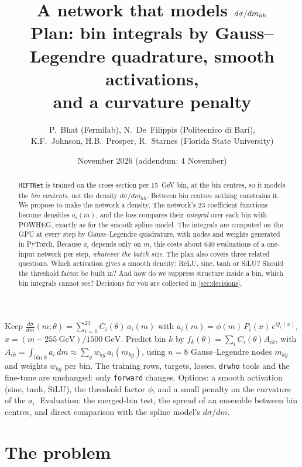 \documentclass[11pt]{article}
\title{\textbf{A network that models $d\sigma/d\mhh$}\\[4pt]
\large Plan: bin integrals by Gauss--Legendre quadrature, smooth activations,\\ and a curvature penalty}
\author{P.~Bhat (Fermilab), N.~De~Filippis (Politecnico di Bari),\\
K.F.~Johnson, H.B.~Prosper, R.~Starnes (Florida State University)}
\date{November 2026 (addendum: 4 November)}
\newcommand{\code}[1]{\texttt{#1}}
\newcommand{\mhh}{m_{hh}}
\begin{document}
\maketitle

\begin{abstract}
\noindent
\code{HEFTNet} is trained on the cross section per 15~GeV bin, at the bin centres, so it
models the \emph{bin contents}, not the density $d\sigma/d\mhh$. Between bin centres nothing
constrains it. We propose to make the network a density. The network's 23 coefficient
functions become densities $a_i(m)$, and the loss compares their \emph{integral} over each
bin with POWHEG, exactly as for the smooth spline model. The integrals are computed on the
GPU at every step by Gauss--Legendre quadrature, with nodes and weights generated in PyTorch.
Because $a_i$ depends only on $m$, this costs about 640 evaluations of a one-input network
per step, \emph{whatever the batch size}. The plan also covers three related questions. Which
activation gives a smooth density: ReLU, sine, tanh or SiLU? Should the threshold factor be
built in? And how do we suppress structure inside a bin, which bin integrals cannot see?
Decisions for you are collected in \cref{sec:decisions}.
\end{abstract}

\begin{keyidea}
Keep $\displaystyle \frac{d\sigma}{dm}(m;\theta)=\sum_{i=1}^{23}C_i(\theta)\,a_i(m)$ with
$a_i(m)=\phi(m)\,P_i(x)\,e^{Q_i(x)}$, $x=(m-255~\text{GeV})/1500~\text{GeV}$. Predict bin
$k$ by $f_k(\theta)=\sum_iC_i(\theta)A_{ik}$, with $A_{ik}=\int_{\text{bin }k}a_i\,dm\approx
\sum_{g}w_{kg}\,a_i(m_{kg})$, using $n=8$ Gauss--Legendre nodes $m_{kg}$ and weights
$w_{kg}$ per bin. The training rows, targets, losses, \code{drwho} tools and the fine-tune
are unchanged: only \code{forward} changes. Options: a smooth activation (sine, tanh, SiLU),
the threshold factor $\phi$, and a small penalty on the curvature of the $a_i$. Evaluation: the
merged-bin test, the spread of an ensemble between bin centres, and direct comparison with
the spline model's $d\sigma/dm$.
\end{keyidea}

\tableofcontents

\section{The problem}
\label{sec:problem}
\end{document}
